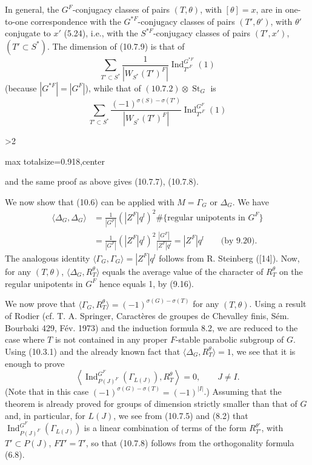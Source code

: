 \documentclass[9pt,twoside]{extarticle}
\newcommand{\EditionPage}[3]{%
  \ifnum#1>2\clearpage\fi
  \pdfbookmark[1]{Printed page #2}{en-folio-#2}%
  \hypertarget{en-physical-#1}{}%
  \noindent\begin{adjustbox}{max totalsize={\textwidth}{0.918\textheight},center}
  \begin{minipage}[t]{\textwidth}
  \fontsize{9.4}{11.1}\selectfont\justifying
  #3
  \end{minipage}
  \end{adjustbox}%
}
\begin{document}
{In general, the \(G^F\)-conjugacy classes of pairs \((T,\theta)\), with \([\theta]=x\), are in one-to-one correspondence with the \(G^{*F}\)-conjugacy classes of pairs \((T',\theta')\), with \(\theta'\) conjugate to \(x'\) (5.24), i.e., with the \(S^{*F}\)-conjugacy classes of pairs \((T',x')\), \((T'\subset S^*)\). The dimension of (10.7.9) is that of \[
\sum_{T'\subset S^*}
\frac1{|W_{S^*}(T')^F|}
\operatorname{Ind}_{T'^F}^{G^{*F}}(1)
\] (because \(|G^{*F}|=|G^F|\)), while that of \((10.7.2)\otimes\operatorname{St}_G\) is \[
\sum_{T'\subset S^*}
\frac{(-1)^{\sigma(S)-\sigma(T')}}{|W_{S^*}(T')^F|}
\operatorname{Ind}_{T'^F}^{G^F}(1)
\]\par
}

\EditionPage{58}{159}{%
and the same proof as above gives (10.7.7), (10.7.8).\par

We now show that (10.6) can be applied with \(M=\Gamma_G\) or \(\Delta_G\). We have \[
\begin{aligned}
\langle\Delta_G,\Delta_G\rangle
&=\frac1{|G^F|}(|Z^F|q^l)^2\#\{\text{regular unipotents in }G^F\}\\
&=\frac1{|G^F|}(|Z^F|q^l)^2\frac{|G^F|}{|Z^F|q^l}
=|Z^F|q^l\qquad\text{(by 9.20)}.
\end{aligned}
\] The analogous identity \(\langle\Gamma_G,\Gamma_G\rangle=|Z^F|q^l\) follows from R. Steinberg ([14]). Now, for any \((T,\theta)\), \(\langle\Delta_G,R_T^\theta\rangle\) equals the average value of the character of \(R_T^\theta\) on the regular unipotents in \(G^F\) hence equals 1, by (9.16).\par

We now prove that \(\langle\Gamma_G,R_T^\theta\rangle=(-1)^{\sigma(G)-\sigma(T)}\) for any \((T,\theta)\). Using a result of Rodier (cf. T. A. Springer, Caractères de groupes de Chevalley finis, Sém. Bourbaki 429, Fév. 1973) and the induction formula 8.2, we are reduced to the case where \(T\) is not contained in any proper \(F\)-stable parabolic subgroup of \(G\). Using (10.3.1) and the already known fact that \(\langle\Delta_G,R_T^\theta\rangle=1\), we see that it is enough to prove \[
\tag{10.7.8}
\left\langle
\operatorname{Ind}_{P(J)^F}^{G^F}(\Gamma_{L(J)}),R_T^\theta
\right\rangle=0,
\qquad J\ne I.
\] (Note that in this case \((-1)^{\sigma(G)-\sigma(T)}=(-1)^{|I|}\).) Assuming that the theorem is already proved for groups of dimension strictly smaller than that of \(G\) and, in particular, for \(L(J)\), we see from (10.7.5) and (8.2) that \(\operatorname{Ind}_{P(J)^F}^{G^F}(\Gamma_{L(J)})\) is a linear combination of terms of the form \(R_{T'}^{\theta'}\), with \(T'\subset P(J)\), \(FT'=T'\), so that (10.7.8) follows from the orthogonality formula (6.8).\par

}
\end{document}
